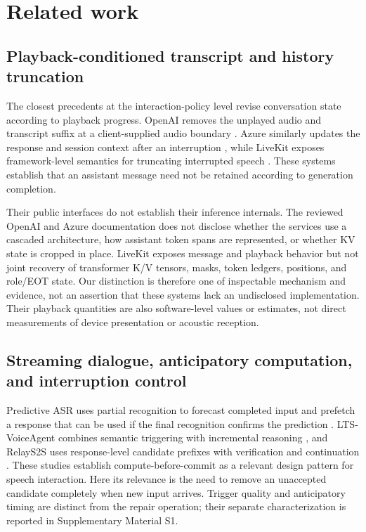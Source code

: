 \section{Related work}
\label{sec:related}

\subsection{Playback-conditioned transcript and history truncation}

The closest precedents at the interaction-policy level revise conversation state according to playback progress. OpenAI removes the unplayed audio and transcript suffix at a client-supplied audio boundary \citep{openaiRealtimeConversations}. Azure similarly updates the response and session context after an interruption \citep{microsoftVoiceLiveAutoTruncation2026}, while LiveKit exposes framework-level semantics for truncating interrupted speech \citep{livekitEventsErrorHandling}. These systems establish that an assistant message need not be retained according to generation completion.

Their public interfaces do not establish their inference internals. The reviewed OpenAI and Azure documentation does not disclose whether the services use a cascaded architecture, how assistant token spans are represented, or whether KV state is cropped in place. LiveKit exposes message and playback behavior but not joint recovery of transformer K/V tensors, masks, token ledgers, positions, and role/EOT state. Our distinction is therefore one of inspectable mechanism and evidence, not an assertion that these systems lack an undisclosed implementation. Their playback quantities are also software-level values or estimates, not direct measurements of device presentation or acoustic reception.

\subsection{Streaming dialogue, anticipatory computation, and interruption control}

Predictive ASR uses partial recognition to forecast completed input and prefetch a response that can be used if the final recognition confirms the prediction \citep{schwarz2023PersonalizedPredictiveASR}. LTS-VoiceAgent combines semantic triggering with incremental reasoning \citep{zou2026LTSVoiceAgent}, and RelayS2S uses response-level candidate prefixes with verification and continuation \citep{mai2026RelayS2S}. These studies establish compute-before-commit as a relevant design pattern for speech interaction. Here its relevance is the need to remove an unaccepted candidate completely when new input arrives. Trigger quality and anticipatory timing are distinct from the repair operation; their separate characterization is reported in Supplementary Material S1.

